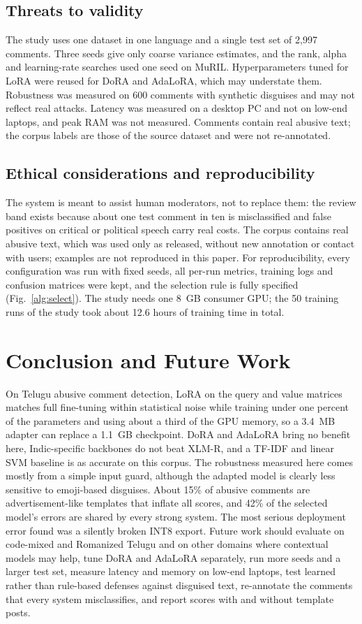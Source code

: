 \documentclass[conference]{IEEEtran}
\begin{document}
\subsection{Threats to validity}
The study uses one dataset in one language and a single test set of 2,997 comments. Three seeds give only coarse variance estimates, and the rank, alpha and learning-rate searches used one seed on MuRIL. Hyperparameters tuned for LoRA were reused for DoRA and AdaLoRA, which may understate them. Robustness was measured on 600 comments with synthetic disguises and may not reflect real attacks. Latency was measured on a desktop PC and not on low-end laptops, and peak RAM was not measured. Comments contain real abusive text; the corpus labels are those of the source dataset and were not re-annotated.

\subsection{Ethical considerations and reproducibility}
The system is meant to assist human moderators, not to replace them: the review band exists because about one test comment in ten is misclassified and false positives on critical or political speech carry real costs. The corpus contains real abusive text, which was used only as released, without new annotation or contact with users; examples are not reproduced in this paper. For reproducibility, every configuration was run with fixed seeds, all per-run metrics, training logs and confusion matrices were kept, and the selection rule is fully specified (Fig.~\ref{alg:select}). The study needs one 8~GB consumer GPU; the 50 training runs of the study took about 12.6 hours of training time in total.

\section{Conclusion and Future Work}
\label{sec:concl}
On Telugu abusive comment detection, LoRA on the query and value matrices matches full fine-tuning within statistical noise while training under one percent of the parameters and using about a third of the GPU memory, so a 3.4~MB adapter can replace a 1.1~GB checkpoint. DoRA and AdaLoRA bring no benefit here, Indic-specific backbones do not beat XLM-R, and a TF-IDF and linear SVM baseline is as accurate on this corpus. The robustness measured here comes mostly from a simple input guard, although the adapted model is clearly less sensitive to emoji-based disguises. About 15\% of abusive comments are advertisement-like templates that inflate all scores, and 42\% of the selected model's errors are shared by every strong system. The most serious deployment error found was a silently broken INT8 export. Future work should evaluate on code-mixed and Romanized Telugu and on other domains where contextual models may help, tune DoRA and AdaLoRA separately, run more seeds and a larger test set, measure latency and memory on low-end laptops, test learned rather than rule-based defenses against disguised text, re-annotate the comments that every system misclassifies, and report scores with and without template posts.
\end{document}
